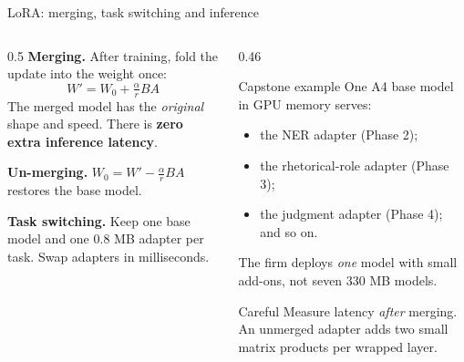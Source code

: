 \documentclass[aspectratio=169,11pt]{beamer}
\begin{document}
\begin{frame}{LoRA: merging, task switching and inference}
  \begin{columns}[T]
    \begin{column}{0.5\textwidth}
      \small
      \textbf{Merging.} After training, fold the update into the weight once:
      \[
        W' = W_0 + \tfrac{\alpha}{r}BA
      \]
      The merged model has the \emph{original} shape and speed. There is \textbf{zero extra inference latency}.
      \vspace{2mm}

      \textbf{Un-merging.} $W_0 = W'-\tfrac{\alpha}{r}BA$ restores the base model.
      \vspace{1mm}

      \textbf{Task switching.} Keep one base model and one 0.8 MB adapter per task. Swap adapters in milliseconds.
    \end{column}
    \begin{column}{0.46\textwidth}
      \begin{exampleblock}{Capstone example}
        \small
        One A4 base model in GPU memory serves:
        \begin{itemize}
          \item the NER adapter (Phase 2);
          \item the rhetorical-role adapter (Phase 3);
          \item the judgment adapter (Phase 4); and so on.
        \end{itemize}
        The firm deploys \emph{one} model with small add-ons, not seven 330 MB models.
      \end{exampleblock}
      \begin{alertblock}{Careful}
        \small
        Measure latency \emph{after} merging. An unmerged adapter adds two small matrix products per wrapped layer.
      \end{alertblock}
    \end{column}
  \end{columns}
\end{frame}
\end{document}

